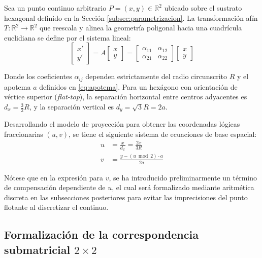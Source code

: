 Sea un punto continuo arbitrario $P = (x, y) \in \mathbb{R}^2$ ubicado sobre el sustrato hexagonal definido en la Sección \ref{subsec:parametrizacion}. La transformación afín $T: \mathbb{R}^2 \to \mathbb{R}^2$ que reescala y alinea la geometría poligonal hacia una cuadrícula euclidiana se define por el sistema lineal:
\begin{equation}
    \begin{bmatrix} x' \\ y' \end{bmatrix} = A \begin{bmatrix} x \\ y \end{bmatrix} = \begin{bmatrix} \alpha_{11} & \alpha_{12} \\ \alpha_{21} & \alpha_{22} \end{bmatrix} \begin{bmatrix} x \\ y \end{bmatrix}
    \label{eq:matriz_transformacion}
\end{equation}

Donde los coeficientes $\alpha_{ij}$ dependen estrictamente del radio circunscrito $R$ y el apotema $a$ definidos en \eqref{eq:apotema}. Para un hexágono con orientación de vértice superior (\textit{flat-top}), la separación horizontal entre centros adyacentes es $d_x = \frac{3}{2}R$, y la separación vertical es $d_y = \sqrt{3}R = 2a$. 

Desarrollando el modelo de proyección para obtener las coordenadas lógicas fraccionarias $(u, v)$, se tiene el siguiente sistema de ecuaciones de base espacial:
\begin{equation}
    \begin{aligned}
        u &= \frac{x}{d_x} = \frac{2x}{3R} \\
        v &= \frac{y - (u \bmod 2) \cdot a}{2a}
    \end{aligned}
    \label{eq:sistema_mapeo_continuo}
\end{equation}

Nótese que en la expresión para $v$, se ha introducido preliminarmente un término de compensación dependiente de $u$, el cual será formalizado mediante aritmética discreta en las subsecciones posteriores para evitar las imprecisiones del punto flotante al discretizar el continuo.

\subsection{Formalización de la correspondencia submatricial $2 \times 2$}
\label{subsec:correspondencia_submatricial}


